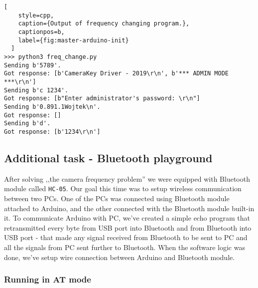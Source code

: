 \begin{minipage}{\linewidth}
  \begin{lstlisting}[
    style=cpp,
    caption={Output of frequency changing program.},
    captionpos=b,
    label={fig:master-arduino-init}
  ]
>>> python3 freq_change.py
Sending b'5789'.
Got response: [b'CameraKey Driver - 2019\r\n', b'*** ADMIN MODE ***\r\n']
Sending b'c 1234'.
Got response: [b"Enter administrator's password: \r\n"]
Sending b'0.891.1Wojtek\n'.
Got response: []
Sending b'd'.
Got response: [b'1234\r\n']
  \end{lstlisting}
  \end{minipage}

\subsection{Additional task - Bluetooth playground}

After solving ,,the camera frequency problem'' we were equipped with Bluetooth module called \texttt{HC-05}. Our goal this time was to setup wireless communication between two PCs. One of the PCs was connected using Bluetooth module attached to Arduino, and the other connected with the Bluetooth module built-in it. To communicate Arduino with PC, we've created a simple echo program that retransmitted every byte from USB port into Bluetooth and from Bluetooth into USB port - that made any signal received from Bluetooth to be sent to PC and all the signals from PC sent further to Bluetooth. When the software logic was done, we've setup wire connection between Arduino and Bluetooth module.

\subsubsection{Running in AT mode}
